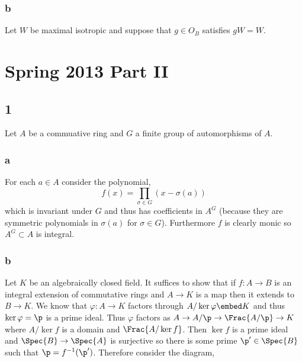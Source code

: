 \documentclass[12pt]{article}
\begin{document}
\subsubsection{b}

Let $W$ be maximal isotropic and suppose that $g \in O_B$ satisfies $g W = W$. 

\section{Spring 2013 Part II}

\subsection{1}

Let $A$ be a commuative ring and $G$ a finite group of automorphisms of $A$.

\subsubsection{a}

For each $a \in A$ consider the polynomial,
\[ f(x) = \prod_{\sigma \in G} (x - \sigma(a)) \]
which is invariant under $G$ and thus has coefficients in $A^G$ (because they are symmetric polynomials in $\sigma(a)$ for $\sigma \in G$). Furthermore $f$ is clearly monic so $A^G \subset A$ is integral.

\subsubsection{b}

Let $K$ be an algebraically closed field. It suffices to show that if $f : A \to B$ is an integral extension of commutative rings and $A \to K$ is a map then it extends to $B \to K$. We know that $\varphi : A \to K$ factors through $A / \ker{\varphi} \embed K$ and thus $\ker{\varphi} = \p$ is a prime ideal. Thus $\varphi$ factors as $A \to A / \p \to \Frac{A / \p} \to K$ where $A / \ker{f}$ is a domain and $\Frac{A / \ker{f}}$. Then $\ker{f}$ is a prime ideal and $\Spec{B} \to \Spec{A}$ is surjective so there is some prime $\p' \in \Spec{B}$ such that $\p = f^{-1}(\p')$. Therefore consider the diagram,
\begin{center}
\end{center}
\end{document}
